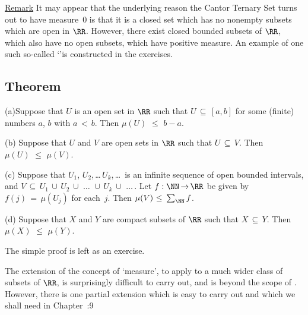 \V

        \underline{Remark} It may appear that the underlying reason the Cantor Ternary Set turns out to have measure~$0$ is that it is a closed set which has no nonempty subsets which are open in ${\RR}$.
    However, there exist closed bounded subsets of ${\RR}$, which also have no open subsets, which have positive measure.
    An example of one such so-called `'is constructed in the exercises.

\V
\V

        \subsection{\small{{\bf Theorem}}}
        \label{ThmG25.35}

\V

\hspace*{\parindent}(a)Suppose that $U$ is an open set in ${\RR}$ such that $U \,{\subseteq}\, [a,b]$ for some (finite) numbers $a$, $b$ with $a\,<\,b$.
    Then ${\mu}(U)\,\,{\leq}\,\,b-a$.

\V

        (b) Suppose that $U$ and $V$ are open sets in ${\RR}$ such that $U \,{\subseteq}\, V$.
    Then ${\mu}(U)\,\,{\leq}\,\,{\mu}(V)$.

\V

        (c) Suppose that $U_{1}$, $U_{2}$,\,{\ldots}\,$U_{k}$,\,{\ldots}\, is an infinite sequence of open bounded intervals,
    and $V \,{\subseteq}\, U_{1}\,{\cup}\,U_{2}\,{\cup}\,\,{\ldots}\,\,
    {\cup}\,U_{k}\,{\cup}\,\,{\ldots}\,$.
    Let $f:{\NN} \,{\rightarrow}\, {\RR}$ be given by $f(j) \,=\, {\mu}(U_{j})$ for each~$j$.
    Then ${\mu}(V)\,\,{\leq}\,\,\sum_{{\NN}} f$.

\V

        (d) Suppose that $X$ and $Y$ are compact subsets of ${\RR}$ such that $X \,{\subseteq}\, Y$.
    Then ${\mu}(X)\,\,{\leq}\,\,{\mu}(Y)$.


\V

        The simple proof is left as an exercise. \Q

\V
\V

        The extension of the concept of `measure', to apply to a much wider class of subsets of ${\RR}$,
    is surprisingly difficult to carry out, and is beyond the scope of {\TheseNotes}.
    However, there is one partial extension which is easy to carry out and which we shall need in Chapter~:9

\V

